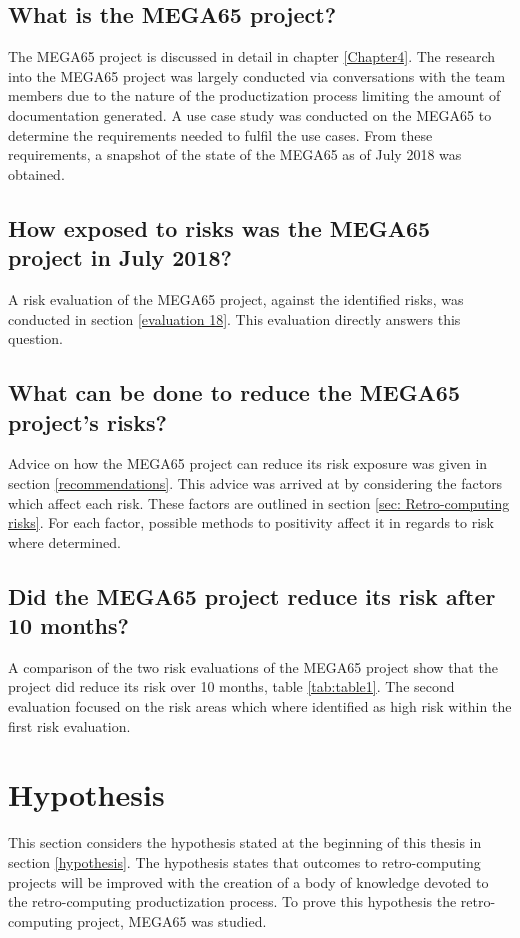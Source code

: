 \subsection{What is the MEGA65 project?}
The MEGA65 project is discussed in detail in chapter \ref{Chapter4}. The research into the MEGA65 project was largely conducted via conversations with the team members due to the nature of the productization process limiting the amount of documentation generated. A use case study was conducted on the MEGA65 to determine the requirements needed to fulfil the use cases. From these requirements, a snapshot of the state of the MEGA65 as of July 2018 was obtained.

\subsection{How exposed to risks was the MEGA65 project in July 2018?}
A risk evaluation of the MEGA65 project, against the identified risks, was conducted in section \ref{evaluation 18}. This evaluation directly answers this question. 

\subsection{What can be done to reduce the MEGA65 project's risks?}
Advice on how the MEGA65 project can reduce its risk exposure was given in section \ref{recommendations}. This advice was arrived at by considering the factors which affect each risk. These factors are outlined in section \ref{sec: Retro-computing risks}. For each factor, possible methods to positivity affect it in regards to risk where determined.

\subsection{Did the MEGA65 project reduce its risk after 10 months?}
A comparison of the two risk evaluations of the MEGA65 project show that the project did reduce its risk over 10 months, table \ref{tab:table1}. The second evaluation focused on the risk areas which where identified as high risk within the first risk evaluation. 

\section{Hypothesis}
This section considers the hypothesis stated at the beginning of this thesis in section \ref{hypothesis}. The hypothesis states that outcomes to retro-computing projects will be improved with the creation of a body of knowledge devoted to the retro-computing productization process. To prove this hypothesis the retro-computing project, MEGA65 was studied. 

